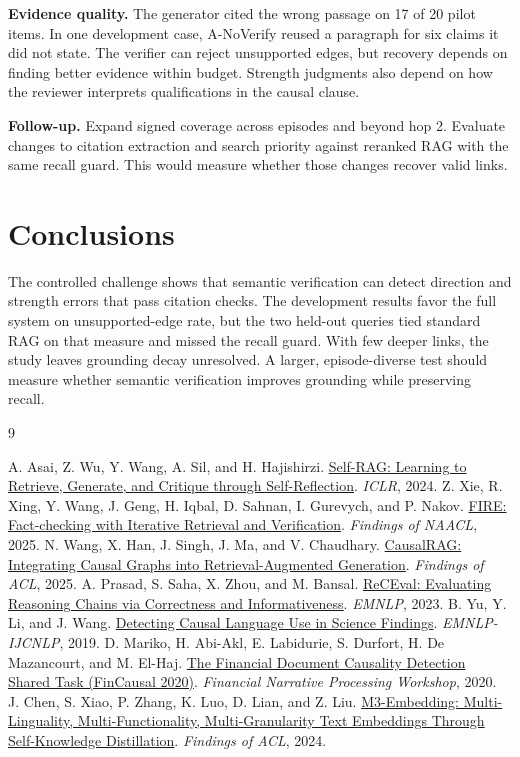 \documentclass[11pt,a4paper]{article}
\begin{document}
\textbf{Evidence quality.} The generator cited the wrong passage on
17 of 20 pilot items. In one development case, A-NoVerify reused a
paragraph for six claims it did not state. The verifier can reject
unsupported edges, but recovery depends on finding better evidence
within budget. Strength judgments also depend on how the reviewer
interprets qualifications in the causal clause.

\textbf{Follow-up.} Expand signed coverage across episodes and beyond hop 2.
Evaluate changes to citation extraction and search priority against
reranked RAG with the same recall guard. This would measure whether those
changes recover valid links.

\section{Conclusions}\label{conclusions}

The controlled challenge shows that semantic verification can detect
direction and strength errors that pass citation checks. The
development results favor the full system on unsupported-edge rate, but
the two held-out queries tied standard RAG on that measure and missed the
recall guard. With few deeper links, the study leaves grounding decay
unresolved. A larger, episode-diverse test should measure whether
semantic verification improves grounding while preserving recall.

\begin{thebibliography}{9}
\raggedright
\setlength{\itemsep}{3pt}
 A. Asai, Z. Wu, Y. Wang, A. Sil, and H. Hajishirzi.
\href{https://openreview.net/forum?id=hSyW5go0v8}{Self-RAG: Learning to Retrieve, Generate, and Critique through Self-Reflection}.
\emph{ICLR}, 2024.
 Z. Xie, R. Xing, Y. Wang, J. Geng, H. Iqbal, D. Sahnan, I. Gurevych, and P. Nakov.
\href{https://aclanthology.org/2025.findings-naacl.158/}{FIRE: Fact-checking with Iterative Retrieval and Verification}.
\emph{Findings of NAACL}, 2025.
 N. Wang, X. Han, J. Singh, J. Ma, and V. Chaudhary.
\href{https://aclanthology.org/2025.findings-acl.1165/}{CausalRAG: Integrating Causal Graphs into Retrieval-Augmented Generation}.
\emph{Findings of ACL}, 2025.
 A. Prasad, S. Saha, X. Zhou, and M. Bansal.
\href{https://aclanthology.org/2023.emnlp-main.622/}{ReCEval: Evaluating Reasoning Chains via Correctness and Informativeness}.
\emph{EMNLP}, 2023.
 B. Yu, Y. Li, and J. Wang.
\href{https://aclanthology.org/D19-1473/}{Detecting Causal Language Use in Science Findings}.
\emph{EMNLP-IJCNLP}, 2019.
 D. Mariko, H. Abi-Akl, E. Labidurie, S. Durfort, H. De Mazancourt, and M. El-Haj.
\href{https://aclanthology.org/2020.fnp-1.3/}{The Financial Document Causality Detection Shared Task (FinCausal 2020)}.
\emph{Financial Narrative Processing Workshop}, 2020.
 J. Chen, S. Xiao, P. Zhang, K. Luo, D. Lian, and Z. Liu.
\href{https://aclanthology.org/2024.findings-acl.137/}{M3-Embedding: Multi-Linguality, Multi-Functionality, Multi-Granularity Text Embeddings Through Self-Knowledge Distillation}.
\emph{Findings of ACL}, 2024.
\end{thebibliography}
\end{document}
